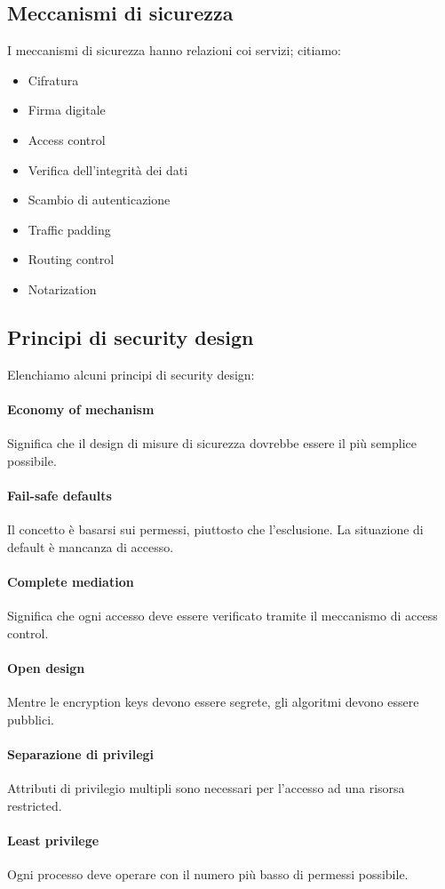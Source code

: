 \documentclass[11pt]{article}
\begin{document}
\subsection{Meccanismi di sicurezza}
I meccanismi di sicurezza hanno relazioni coi servizi; citiamo:
\begin{itemize}
    \item Cifratura
    \item Firma digitale
    \item Access control
    \item Verifica dell'integrità dei dati
    \item Scambio di autenticazione
    \item Traffic padding
    \item Routing control
    \item Notarization
\end{itemize}
\subsection{Principi di security design}
Elenchiamo alcuni principi di security design:
\paragraph{Economy of mechanism} Significa che il design di misure di sicurezza dovrebbe essere il più semplice possibile.
\paragraph{Fail-safe defaults} Il concetto è basarsi sui permessi, piuttosto che l'esclusione. La situazione di default è mancanza di accesso.
\paragraph{Complete mediation} Significa che ogni accesso deve essere verificato tramite il meccanismo di access control.
\paragraph{Open design} Mentre le encryption keys devono essere segrete, gli algoritmi devono essere pubblici.
\paragraph{Separazione di privilegi} Attributi di privilegio multipli sono necessari per l'accesso ad una risorsa restricted.
\paragraph{Least privilege} Ogni processo deve operare con il numero più basso di permessi possibile.
\end{document}
